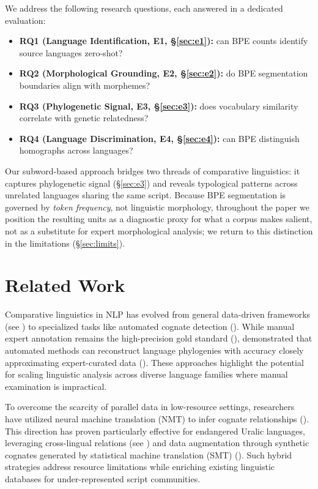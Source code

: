 \documentclass[11pt]{article}
\begin{document}
\label{sec:intro-rq}%
We address the following research questions, each answered in a dedicated evaluation:
\begin{itemize}[noitemsep,topsep=0.2em]
\item \textbf{RQ1 (Language Identification, E1, \S\ref{sec:e1}):} can BPE counts identify source languages zero-shot?
\item \textbf{RQ2 (Morphological Grounding, E2, \S\ref{sec:e2}):} do BPE segmentation boundaries align with morphemes?
\item \textbf{RQ3 (Phylogenetic Signal, E3, \S\ref{sec:e3}):} does vocabulary similarity correlate with genetic relatedness?
\item \textbf{RQ4 (Language Discrimination, E4, \S\ref{sec:e4}):} can BPE distinguish homographs across languages?
\end{itemize}

Our subword-based approach bridges two threads of comparative linguistics: it captures phylogenetic signal (\S\ref{sec:e3}) and reveals typological patterns across unrelated languages sharing the same script. Because BPE segmentation is governed by \emph{token frequency}, not linguistic morphology, throughout the paper we position the resulting units as a diagnostic proxy for what a corpus makes salient, not as a substitute for expert morphological analysis; we return to this distinction in the limitations (\S\ref{sec:limits}).

\section{Related Work}

Comparative linguistics in NLP has evolved from general data-driven frameworks (see \citealt{bender2011languageindependence, ostling2016continuous, imanigooghari-etal-2023-glot500}) to specialized tasks like automated cognate detection (\citealt{ciobanu2014cognates}). While manual expert annotation remains the high-precision gold standard (\citealt{Nichols1992LinguisticDI}), \citet{rama2018automatic} demonstrated that automated methods can reconstruct language phylogenies with accuracy closely approximating expert-curated data (\citealt{Jger2018GlobalscalePL}). These approaches highlight the potential for scaling linguistic analysis across diverse language families where manual examination is impractical.

To overcome the scarcity of parallel data in low-resource settings, researchers have utilized neural machine translation (NMT) to infer cognate relationships (\citealt{h2019finding}). This direction has proven particularly effective for endangered Uralic languages, leveraging cross-lingual relations (see \citealt{partanen2021processing, chelombitko-komissarov-2024-specialized, chelombitko-etal-2025-samponlp}) and data augmentation through synthetic cognates generated by statistical machine translation (SMT) (\citealt{poncelas2019combiningsmtnmtbacktranslated}). Such hybrid strategies address resource limitations while enriching existing linguistic databases for under-represented script communities.
\end{document}
